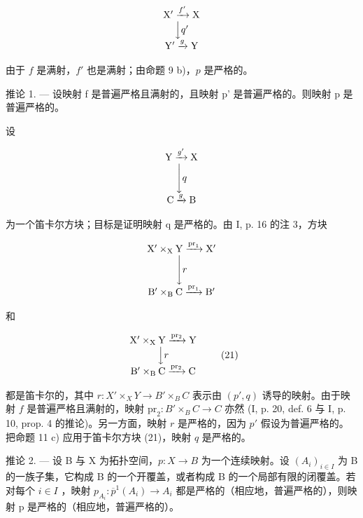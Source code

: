 \[
\begin{array}{c} \mathrm {X^ {\prime}} \xrightarrow {f ^ {\prime}} \mathrm{X} \\ \Big \downarrow q ^ {\prime} \\ \mathrm {Y^ {\prime}} \xrightarrow {g} \mathrm{Y} \end{array}
\]

由于 \(f\) 是满射，\(f'\) 也是满射；由命题 9 b)，\(p\) 是严格的。

推论 1. --- 设映射 f 是普遍严格且满射的，且映射 p' 是普遍严格的。则映射 p 是普遍严格的。

设

\[
\begin{array}{c} \mathrm{Y} \xrightarrow {g ^ {\prime}} \mathrm{X} \\ \Biggl \downarrow q \\ \mathrm{C} \xrightarrow {g} \mathrm{B} \end{array}
\]

为一个笛卡尔方块；目标是证明映射 q 是严格的。由 I, p. 16 的注 3，方块

\[
\begin{array}{c} \mathrm {X^ {\prime}} \times_ {\mathrm{X}} \mathrm{Y} \xrightarrow {\mathrm{pr} _ {1}} \mathrm {X^ {\prime}} \\ \Biggl \downarrow r \\ \mathrm {B^ {\prime}} \times_ {\mathrm{B}} \mathrm{C} \xrightarrow {\mathrm{pr} _ {1}} \mathrm {B^ {\prime}} \end{array}
\]

和

\[
\begin{array}{c} \mathrm {X^ {\prime} \times_ {X} Y\xrightarrow {pr_ {2}} Y} \\ \Big \downarrow r \\ \mathrm {B^ {\prime} \times_ {B} C\xrightarrow {pr_ {2}} C} \end{array}\tag{21}
\]

都是笛卡尔的，其中 \(r \colon X' \times_{X} Y \to B' \times_{B} C\) 表示由 \((p', q)\) 诱导的映射。由于映射 \(f\) 是普遍严格且满射的，映射 \(\mathrm{pr}_2 \colon B' \times_{B} C \to C\) 亦然 (I, p. 20, def. 6 与 I, p. 10, prop. 4 的推论)。另一方面，映射 \(r\) 是严格的，因为 \(p'\) 假设为普遍严格的。把命题 11 c) 应用于笛卡尔方块 (21)，映射 \(q\) 是严格的。

推论 2. --- 设 B 与 X 为拓扑空间，\(p\colon X \to B\) 为一个连续映射。设 \((A_i)_{i \in I}\) 为 B 的一族子集，它构成 B 的一个开覆盖，或者构成 B 的一个局部有限的闭覆盖。若对每个 \(i \in I\) ，映射 \(p_{A_i}\colon \overline{p}^1(A_i) \to A_i\) 都是严格的（相应地，普遍严格的），则映射 p 是严格的（相应地，普遍严格的）。

